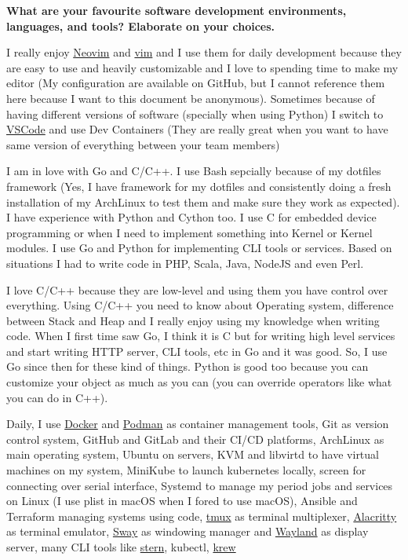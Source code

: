 \noindent
\textbf{What are your favourite software development environments, languages, and tools? Elaborate on your choices.}

I really enjoy \href{https://neovim.io/}{Neovim} and \href{https://www.vim.org/}{vim} and I use them for daily development
because they are easy to use and heavily customizable and I love to spending time to make my editor
(My configuration are available on GitHub, but I cannot reference them here because I want to this document be anonymous).
Sometimes because of having different versions of software (specially when using Python) I switch to \href{https://code.visualstudio.com/}{VSCode}
and use Dev Containers (They are really great when you want to have same version of everything between your team members)

I am in love with Go and C/C++. I use Bash sepcially because of my dotfiles framework (Yes, I have framework for my dotfiles
and consistently doing a fresh installation of my ArchLinux to test them and make sure they work as expected). I have experience with
Python and Cython too. I use C for embedded device programming or when I need to implement something into
Kernel or Kernel modules. I use Go and Python for implementing CLI tools or services.
Based on situations I had to write code in PHP, Scala, Java, NodeJS and even Perl.

I love C/C++ because they are low-level and using them you have control over everything. Using C/C++ you need to know
about Operating system, difference between Stack and Heap and I really enjoy using my knowledge when writing code.
When I first time saw Go, I think it is C but for writing high level services and start writing HTTP server,
CLI tools, etc in Go and it was good. So, I use Go since then for these kind of things. Python is good too because
you can customize your object as much as you can (you can override operators like what you can do in C++).

Daily, I use \href{https://www.docker.com/}{Docker} and \href{https://podman.io/}{Podman} as container management tools,
Git as version control system, GitHub and GitLab and their CI/CD platforms, ArchLinux as main operating system, Ubuntu
on servers, KVM and libvirtd to have virtual machines on my system, MiniKube to launch kubernetes locally,
screen for connecting over serial interface, Systemd to manage my period jobs and services on Linux (I use plist
in macOS when I fored to use macOS),
Ansible and Terraform managing systems using code,
\href{https://github.com/tmux}{tmux} as terminal multiplexer,
\href{https://github.com/alacritty}{Alacritty} as terminal emulator,
\href{https://swaywm.org/}{Sway} as windowing manager and \href{https://wayland.freedesktop.org/}{Wayland} as display server,
many CLI tools like \href{https://github.com/stern/stern}{stern}, kubectl, \href{https://krew.sigs.k8s.io/}{krew}

